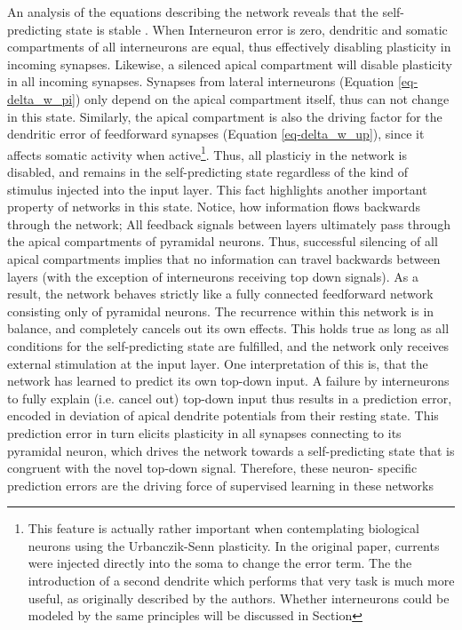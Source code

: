 An analysis of the equations describing the network reveals that the self-predicting state is stable \phrasing. When
Interneuron error is zero, dendritic and somatic compartments of all interneurons are equal, thus effectively disabling
plasticity in incoming synapses. Likewise, a silenced apical compartment will disable plasticity in all incoming
synapses. Synapses from lateral interneurons (Equation \ref{eq-delta_w_pi}) only depend on the apical compartment
itself, thus can not change in this state. Similarly, the apical compartment is also the driving factor for the
dendritic error of feedforward synapses (Equation \ref{eq-delta_w_up}), since it affects somatic activity when
active\footnote{This feature is actually rather important when contemplating biological neurons using the Urbanczik-Senn
plasticity. In the original paper, currents were injected directly into the soma to change the error term. The the
introduction of a second dendrite which performs that very task is much more useful, as originally described by the
authors. Whether interneurons could be modeled by the same principles will be discussed in Section }. Thus, all plasticiy in the network is disabled, and remains in the self-predicting state
regardless of the kind of stimulus injected into the input layer. This fact highlights another important property of
networks in this state. Notice, how information flows backwards through the network; All feedback signals between layers
ultimately pass through the apical compartments of pyramidal neurons. Thus, successful silencing of all apical
compartments implies that no information can travel backwards between layers (with the exception of interneurons
receiving top down signals). As a result, the network behaves strictly like a fully connected feedforward network
consisting only of pyramidal neurons. The recurrence within this network is in balance, and completely cancels out its
own effects. This holds true as long as all conditions for the self-predicting state are fulfilled, and the network only
receives external stimulation at the input layer. One interpretation of this is, that the network has learned to predict
its own top-down input. A failure by interneurons to fully explain (i.e. cancel out) top-down input thus results in a
prediction error, encoded in deviation of apical dendrite potentials from their resting state. This prediction error in
turn elicits plasticity in all synapses connecting to its pyramidal neuron, which drives the network towards a
self-predicting state that is congruent with the novel top-down signal. Therefore, these neuron- specific prediction
errors are the driving force of supervised learning in these networks



